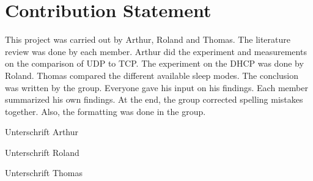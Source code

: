\chapter*{Contribution Statement}
This project was carried out by Arthur, Roland and Thomas. The literature review was done by each member.
Arthur did the experiment and measurements on the comparison of UDP to TCP.
The experiment on the DHCP was done by Roland.
Thomas compared the different available sleep modes.
The conclusion was written by the group. Everyone gave his input on his findings.
Each member summarized his own findings. At the end, the group corrected spelling mistakes together. Also, the formatting was done in the group.

\vspace{2cm}

\begin{minipage}[t]{0.3\textwidth}
    Unterschrift Arthur
\end{minipage}
\begin{minipage}[t]{0.3\textwidth}
    Unterschrift Roland
\end{minipage}
\begin{minipage}[t]{0.3\textwidth}
    Unterschrift Thomas
\end{minipage}